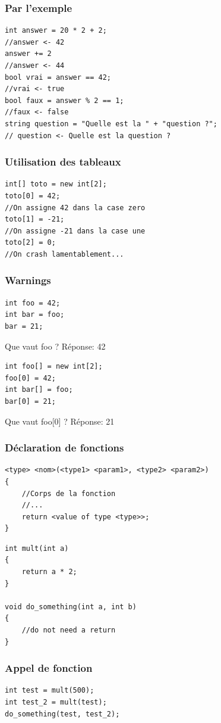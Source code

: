 \documentclass{beamer}
\begin{document}
\begin{frame}[fragile]
\frametitle{Par l'exemple}
\begin{center}
\begin{lstlisting}
int answer = 20 * 2 + 2;
//answer <- 42
answer += 2
//answer <- 44
bool vrai = answer == 42;
//vrai <- true
bool faux = answer % 2 == 1;
//faux <- false
string question = "Quelle est la " + "question ?";
// question <- Quelle est la question ?
\end{lstlisting}
\end{center}
\end{frame}

\begin{frame}[fragile]
\frametitle{Utilisation des tableaux}
\begin{center}
\begin{lstlisting}
int[] toto = new int[2];
toto[0] = 42;
//On assigne 42 dans la case zero
toto[1] = -21;
//On assigne -21 dans la case une
toto[2] = 0;
//On crash lamentablement...
\end{lstlisting}
\end{center}
\end{frame}

\begin{frame}[fragile]
\frametitle{Warnings}
\begin{lstlisting}
int foo = 42;
int bar = foo;
bar = 21;
\end{lstlisting}
Que vaut foo ?
\pause
Réponse: 42
\pause
\begin{lstlisting}
int foo[] = new int[2];
foo[0] = 42;
int bar[] = foo;
bar[0] = 21;
\end{lstlisting}
Que vaut foo[0] ?
\pause
Réponse: 21
\end{frame}

\begin{frame}[fragile]
\frametitle{Déclaration de fonctions}
\begin{lstlisting}
<type> <nom>(<type1> <param1>, <type2> <param2>)
{
    //Corps de la fonction
    //...
    return <value of type <type>>;
}
\end{lstlisting}
\pause
\begin{lstlisting}
int mult(int a)
{
    return a * 2;
}

void do_something(int a, int b)
{
    //do not need a return
}
\end{lstlisting}
\end{frame}

\begin{frame}[fragile]
\frametitle{Appel de fonction}
\begin{lstlisting}
int test = mult(500);
int test_2 = mult(test);
do_something(test, test_2);
\end{lstlisting}
\end{frame}
\end{document}
